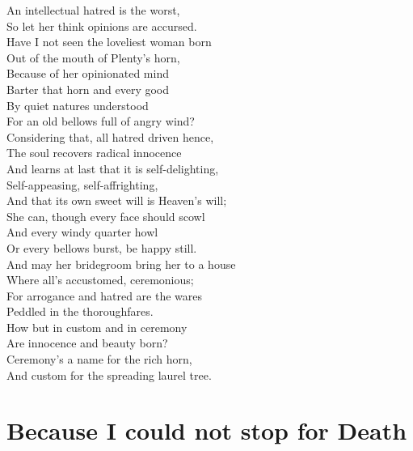 \documentclass[a4,12pt]{article}
\begin{document}
\begin{center}
        \vspace{15pt}
        An intellectual hatred is the worst,\\
        So let her think opinions are accursed.\\
        Have I not seen the loveliest woman born\\
        Out of the mouth of Plenty's horn,\\
        Because of her opinionated mind\\
        Barter that horn and every good\\
        By quiet natures understood\\
        For an old bellows full of angry wind?\\

        \vspace{15pt}
        Considering that, all hatred driven hence,\\
        The soul recovers radical innocence\\
        And learns at last that it is self-delighting,\\
        Self-appeasing, self-affrighting,\\
        And that its own sweet will is Heaven's will;\\
        She can, though every face should scowl\\
        And every windy quarter howl\\
        Or every bellows burst, be happy still.\\

        \vspace{15pt}
        And may her bridegroom bring her to a house\\
        Where all's accustomed, ceremonious;\\
        For arrogance and hatred are the wares\\
        Peddled in the thoroughfares.\\
        How but in custom and in ceremony\\
        Are innocence and beauty born?\\
        Ceremony's a name for the rich horn,\\
        And custom for the spreading laurel tree.\\
        

        \newpage
        \section{Because I could not stop for Death}

\end{center}
\end{document}
